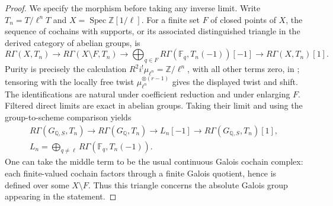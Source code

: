 \begin{proof}
We specify the morphism before taking any inverse limit.
Write \(T_n=T/\ell^nT\) and
\(X=\operatorname{Spec}\mathbb Z[1/\ell]\). For a finite
set \(F\) of closed points of \(X\), the sequence of
cochains with supports, or its associated distinguished
triangle in the derived category of abelian groups, is
\[
 R\Gamma(X,T_n)\longrightarrow
 R\Gamma(X\setminus F,T_n)\longrightarrow
 \bigoplus_{q\in F}R\Gamma(\mathbb F_q,T_n(-1))[-1]
 \longrightarrow R\Gamma(X,T_n)[1].
\]
Purity is precisely the calculation
\(R^2i^!\mu_{\ell^n}=\mathbb Z/\ell^n\), with all
other terms zero, in \cite[II.1.7(b)]{GhostMilneADT};
tensoring with the locally free twist \(\mu_{\ell^n}^{\otimes(r-1)}\)
gives the displayed twist and shift. The identifications
are natural under coefficient reduction and under enlarging
\(F\). Filtered direct limits are exact in abelian groups.
Taking their limit and using the group-to-scheme comparison
\cite[II.2.9]{GhostMilneADT} yields
\[
 \begin{gathered}
 R\Gamma(G_{\mathbb Q,S},T_n)\longrightarrow
 R\Gamma(G_{\mathbb Q},T_n)\longrightarrow L_n[-1]
 \longrightarrow R\Gamma(G_{\mathbb Q,S},T_n)[1],\\
 L_n=\bigoplus_{q\ne\ell}R\Gamma(\mathbb F_q,T_n(-1)).
 \end{gathered}
\]
One can take the middle term to be the usual continuous
Galois cochain complex: each finite-valued cochain factors
through a finite Galois quotient, hence is defined over
some \(X\setminus F\). Thus this triangle concerns the
absolute Galois group appearing in the statement.


\end{proof}
